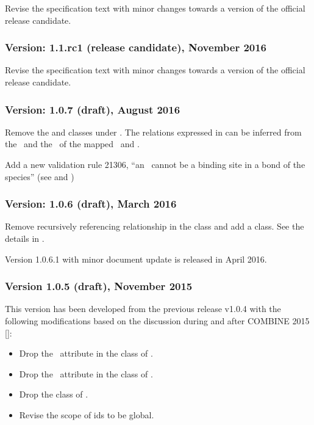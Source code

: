 Revise the specification text with minor changes towards a version of the official release candidate. 

\subsubsection{Version: 1.1.rc1 (release candidate), November 2016}
\label{def:v1_1_rc1}

Revise the specification text with minor changes towards a version of the official release candidate. 


\subsubsection{Version: 1.0.7 (draft), August 2016}
\label{def:v1_0_7}

Remove the  and  classes under \SpeciesTypeComponentMapInProduct. The relations expressed in  can be inferred from the \speciesTypeComponentMapInProduct\ and the \species\ of the mapped \reactant\ and \product.

Add a new validation rule 21306, ``an \outwardBindingSite\ cannot be a binding site in a bond of the species'' (see  and )

\subsubsection{Version: 1.0.6 (draft), March 2016}
\label{def:v1_0_6}

Remove recursively referencing relationship in the \ListOfSpeciesFeatures class and add a \SubListOfSpeciesFeatures class. See the details in \ExSpecies.

Version 1.0.6.1 with minor document update is released in April 2016.

\subsubsection{Version 1.0.5 (draft), November 2015}
\label{def:v1_0_5}

This version has been developed from the previous release v1.0.4 with the following modifications based on the discussion during and after COMBINE 2015 [\cite{ref:combine2015}]: 

\begin{itemize}
 \item Drop the \occurAtt\ attribute in the class of \SpeciesTypeInstance.
 \item Drop the \occurAtt\ attribute in the class of \SpeciesTypeComponentIndex.
 \item Drop the class of .
 \item Revise the scope of \PossibleSpeciesFeatureValue ids to be global.
\end{itemize}

